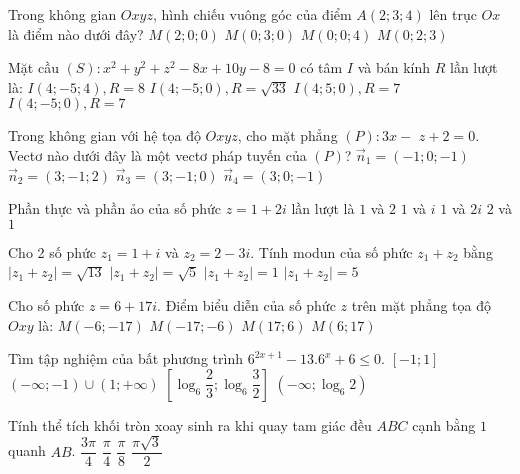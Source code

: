 \begin{ex}%
Trong không gian $O x y z$, hình chiếu vuông góc của điểm $A(2; 3; 4)$ lên trục $O x$ là điểm nào dưới đây?
\choice
{\True $M(2; 0; 0)$}
{$M(0; 3; 0)$}
{$M(0; 0; 4)$}
{$M(0; 2; 3)$}

\end{ex}
\begin{ex}%
Mặt cầu $(S)\colon x^2+y^2+z^2-8 x+10 y-8=0$ có tâm $I$ và bán kính $R$ lần lượt là:
\choice
{$I(4;-5; 4), R=8$}
{$I(4;-5; 0), R=\sqrt{33}$}
{$I(4; 5; 0), R=7$}
{\True $I(4;-5; 0), R=7$}

\end{ex}
\begin{ex}%
Trong không gian với hệ tọa độ $O x y z$, cho mặt phẳng $(P)\colon 3 x-$ $z+2=0$. Vectơ nào dưới đây là một vectơ pháp tuyến của $(P)$?
\choice
{$\vec{n}_1=(-1; 0;-1)$}
{$\vec{n}_2=(3;-1; 2)$}
{$\vec{n}_3=(3;-1; 0)$}
{\True $\vec{n}_4=(3; 0;-1)$}

\end{ex}
\begin{ex}%
Phần thực và phần ảo của số phức $z=1+2 i$ lần lượt là
\choice
{\True $1$ và $2$}
{$1$ và $i$}
{$1$ và $2 i$}
{$2$ và $1$}

\end{ex}
\begin{ex}%
Cho 2 số phức $z_1=1+i$ và $z_2=2-3 i$. Tính modun của số phức $z_1+z_2$ bằng
\choice
{\True $\left|z_1+z_2\right|=\sqrt{13}$}
{$\left|z_1+z_2\right|=\sqrt{5}$}
{$\left|z_1+z_2\right|=1$}
{$\left|z_1+z_2\right|=5$}

\end{ex}
\begin{ex}%
Cho số phức $z=6+17 i$. Điểm biểu diễn của số phức $z$ trên mặt phẳng tọa độ $O x y$ là:
\choice
{$M(-6;-17)$}
{$M(-17;-6)$}
{$M(17; 6)$}
{\True $M(6; 17)$}

\end{ex}
\begin{ex}%
Tìm tập nghiệm của bất phương trình $6^{2 x+1}-13.6^{x}+6\leq 0$.
\choice
{$[-1; 1]$}
{$(-\infty;-1) \cup(1;+\infty)$}
{\True $\left[\log_6 \dfrac{2}{3}; \log_6 \dfrac{3}{2}\right]$}
{ $\left(-\infty; \log_6 2\right)$}

\end{ex}
\begin{ex}%
Tính thể tích khối tròn xoay sinh ra khi quay tam giác đều $ABC$ cạnh bằng $1$ quanh $AB$.
\choice
{$\dfrac{3\pi}{4}$}
{\True $\dfrac{\pi}{4}$}
{$\dfrac{\pi}{8}$}
{$\dfrac{\pi \sqrt{3}}{2}$}

\end{ex}
